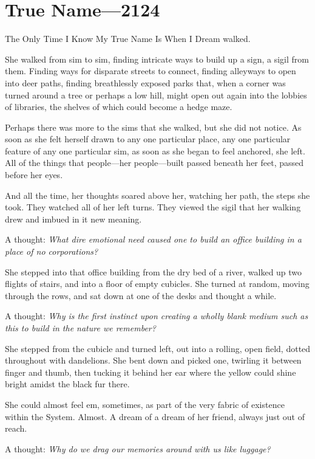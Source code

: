 \hypertarget{true-name-2124}{%
\chapter{True Name—2124}\label{true-name-2124}}

The Only Time I Know My True Name Is When I Dream walked.

She walked from sim to sim, finding intricate ways to build up a sign, a sigil from them. Finding ways for disparate streets to connect, finding alleyways to open into deer paths, finding breathlessly exposed parks that, when a corner was turned around a tree or perhaps a low hill, might open out again into the lobbies of libraries, the shelves of which could become a hedge maze.

Perhaps there was more to the sims that she walked, but she did not notice. As soon as she felt herself drawn to any one particular place, any one particular feature of any one particular sim, as soon as she began to feel anchored, she left. All of the things that people---her people---built passed beneath her feet, passed before her eyes.

And all the time, her thoughts soared above her, watching her path, the steps she took. They watched all of her left turns. They viewed the sigil that her walking drew and imbued in it new meaning.

A thought: \emph{What dire emotional need caused one to build an office building in a place of no corporations?}

She stepped into that office building from the dry bed of a river, walked up two flights of stairs, and into a floor of empty cubicles. She turned at random, moving through the rows, and sat down at one of the desks and thought a while.

A thought: \emph{Why is the first instinct upon creating a wholly blank medium such as this to build in the nature we remember?}

She stepped from the cubicle and turned left, out into a rolling, open field, dotted throughout with dandelions. She bent down and picked one, twirling it between finger and thumb, then tucking it behind her ear where the yellow could shine bright amidst the black fur there.

She could almost feel em, sometimes, as part of the very fabric of existence within the System. Almost. A dream of a dream of her friend, always just out of reach.

A thought: \emph{Why do we drag our memories around with us like luggage?}

